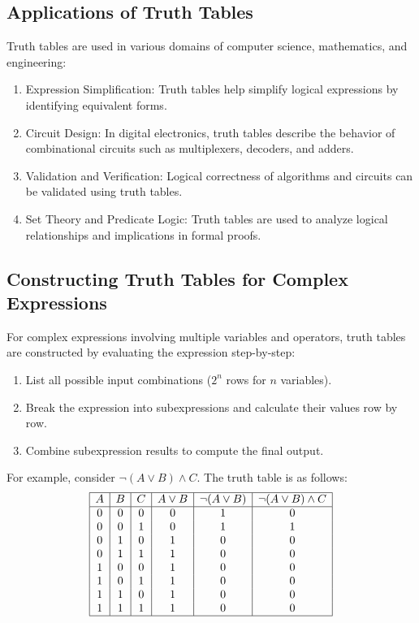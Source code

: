 \subsection{Applications of Truth Tables}
Truth tables are used in various domains of computer science, mathematics, and engineering:
\begin{enumerate}
    \item Expression Simplification: Truth tables help simplify logical expressions by identifying equivalent forms.
    \item Circuit Design: In digital electronics, truth tables describe the behavior of combinational circuits such as multiplexers, decoders, and adders.
    \item Validation and Verification: Logical correctness of algorithms and circuits can be validated using truth tables.
    \item Set Theory and Predicate Logic: Truth tables are used to analyze logical relationships and implications in formal proofs.
\end{enumerate}

\subsection{Constructing Truth Tables for Complex Expressions}
For complex expressions involving multiple variables and operators, truth tables are constructed by evaluating the expression step-by-step:
\begin{enumerate}
    \item List all possible input combinations (\( 2^n \) rows for \( n \) variables).
    \item Break the expression into subexpressions and calculate their values row by row.
    \item Combine subexpression results to compute the final output.
\end{enumerate}

For example, consider \( \neg (A \lor B) \land C \). The truth table is as follows:
\[
\begin{array}{|c|c|c|c|c|c|}
\hline
A & B & C & A \lor B & \neg (A \lor B) & \neg (A \lor B) \land C \\
\hline
0 & 0 & 0 & 0 & 1 & 0 \\
0 & 0 & 1 & 0 & 1 & 1 \\
0 & 1 & 0 & 1 & 0 & 0 \\
0 & 1 & 1 & 1 & 0 & 0 \\
1 & 0 & 0 & 1 & 0 & 0 \\
1 & 0 & 1 & 1 & 0 & 0 \\
1 & 1 & 0 & 1 & 0 & 0 \\
1 & 1 & 1 & 1 & 0 & 0 \\
\hline
\end{array}
\]

